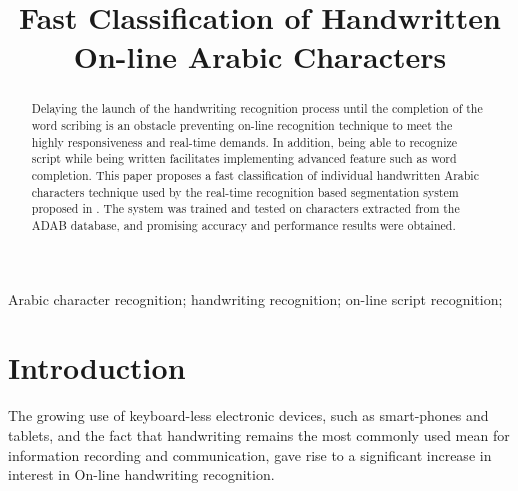 \documentclass[10pt, conference, compsocconf]{IEEEtran}
\begin{document}
\title{Fast Classification of Handwritten On-line Arabic Characters}

\author{
\and
{}
}

\maketitle

\begin{abstract}
Delaying the launch of the handwriting recognition process until the completion of the word scribing is an obstacle preventing on-line recognition technique to meet the highly responsiveness and real-time demands.
In addition, being able to recognize script while being written facilitates implementing advanced feature such as word completion.
This paper proposes a fast classification of individual handwritten Arabic characters technique used by the real-time recognition based segmentation system proposed in \cite{kour2014real}.
The system was trained and tested on characters extracted from the ADAB database, and promising accuracy and performance results were obtained.
\end{abstract}

\begin{IEEEkeywords}
Arabic character recognition; handwriting recognition; on-line script recognition; 
\end{IEEEkeywords}


\section{Introduction}
The growing use of keyboard-less electronic devices, such as smart-phones and tablets, and the fact that handwriting remains the most commonly used mean for information recording and communication, gave rise to a significant increase in interest in On-line handwriting recognition.
\end{document}
